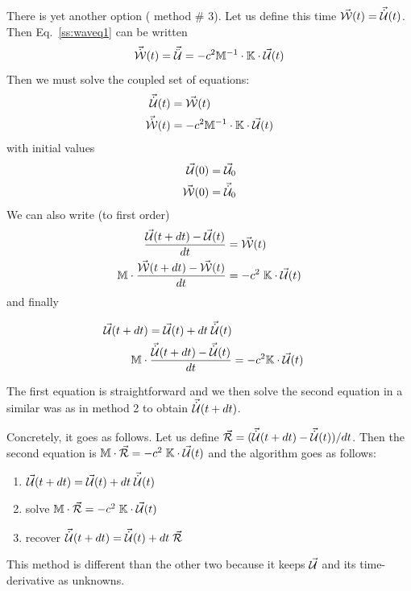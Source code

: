 There is yet another option ({\color{orange} method \# 3}). 
Let us define this time $\vec{\cal W}(t)=\vec{\dot{{\cal U}}}(t)$.
Then Eq.~\eqref{ss:waveq1} can be written 
\[
\vec{\dot{{\cal W}}}(t) = \vec{\ddot{{\cal U}}} = -c^2 {\mathbb{M}}^{-1} 
\cdot {\mathbb{K}} \cdot \vec{\cal U}(t)
\]
Then we must solve the coupled set of equations:
\begin{align}
\vec{\dot{{\cal U}}}(t) &= \vec{\cal W}(t) \\
\vec{\dot{{\cal W}}}(t) &= -c^2 {\mathbb{M}}^{-1} \cdot {\mathbb{K}} \cdot \vec{\cal U}(t) 
\end{align}
with initial values
\begin{align}
\vec{\cal U}(0) &= \vec{\cal U}_0 \\ 
\vec{\cal W}(0) &= \vec{\dot{{\cal U}}}_0
\end{align}
We can also write (to first order)
\begin{align}
\frac{\vec{\cal U}(t+dt)-\vec{\cal U}(t) }{dt}    &= \vec{\cal W}(t) \\
{\mathbb{M}} \cdot \frac{\vec{\cal W}(t+dt)-\vec{\cal W}(t) }{dt}  &= -c^2 \; {\mathbb{K}} \cdot \vec{\cal U}(t) 
\end{align}
and finally
\begin{mdframed}[backgroundcolor=blue!5]
\begin{align}
\vec{\cal U}(t+dt) = \vec{\cal U}(t) + dt \; \vec{\dot{{\cal U}}}(t) \\
{\mathbb{M}} \cdot \frac{\vec{\dot{{\cal U}}}(t+dt)-\vec{\dot{{\cal U}}}(t) }{dt}  &= -c^2 {\mathbb{K}} \cdot \vec{\cal U}(t) 
\end{align}
\end{mdframed}
The first equation is straightforward and we then solve the second equation in a similar 
was as in method 2 to obtain $\vec{\dot{{\cal U}}}(t+dt)$.

Concretely, it goes as follows. Let us define 
$\vec{\cal R}= (\vec{\dot{{\cal U}}}(t+dt)-\vec{\dot{{\cal U}}}(t) )/dt$.
Then the second equation is ${\mathbb{M}} \cdot \vec{\cal R} = -c^2 \; {\mathbb{K}} \cdot \vec{\cal U}(t)$ 
and the algorithm goes 
as follows:
\begin{enumerate}
\item $\vec{\cal U}(t+dt) = \vec{\cal U}(t) + dt \; \vec{\dot{{\cal U}}}(t)$
\item solve ${\mathbb{M}} \cdot \vec{\cal R} = -c^2 \; {\mathbb{K}} \cdot \vec{\cal U}(t)$ 
\item recover $\vec{\dot{{\cal U}}}(t+dt) = \vec{\dot{{\cal U}}}(t) + dt \; \vec{\cal R}$
\end{enumerate}
This method is different than the other two because it keeps $\vec{\cal U}$ 
and its time-derivative as unknowns. 

